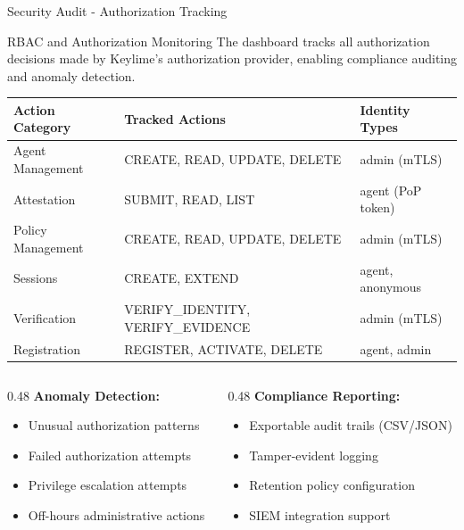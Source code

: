 \begin{frame}{Security Audit - Authorization Tracking}
  \begin{block}{RBAC and Authorization Monitoring}
    \scriptsize
    The dashboard tracks all authorization decisions made by Keylime's authorization provider,
    enabling compliance auditing and anomaly detection.
  \end{block}

  \vspace{0.1cm}

  \scriptsize
  \begin{center}
    \begin{tabular}{|l|l|l|}
      \hline
      \textbf{Action Category} & \textbf{Tracked Actions} & \textbf{Identity Types} \\
      \hline
      \hline
      Agent Management & CREATE, READ, UPDATE, DELETE & admin (mTLS) \\
      \hline
      Attestation & SUBMIT, READ, LIST & agent (PoP token) \\
      \hline
      Policy Management & CREATE, READ, UPDATE, DELETE & admin (mTLS) \\
      \hline
      Sessions & CREATE, EXTEND & agent, anonymous \\
      \hline
      Verification & VERIFY\_IDENTITY, VERIFY\_EVIDENCE & admin (mTLS) \\
      \hline
      Registration & REGISTER, ACTIVATE, DELETE & agent, admin \\
      \hline
    \end{tabular}
  \end{center}

  \vspace{0.2cm}

  \begin{columns}[T]
    \begin{column}{0.48\textwidth}
      \textbf{Anomaly Detection:}
      \begin{itemize}
        \item Unusual authorization patterns
        \item Failed authorization attempts
        \item Privilege escalation attempts
        \item Off-hours administrative actions
      \end{itemize}
    \end{column}
    \begin{column}{0.48\textwidth}
      \textbf{Compliance Reporting:}
      \begin{itemize}
        \item Exportable audit trails (CSV/JSON)
        \item Tamper-evident logging
        \item Retention policy configuration
        \item SIEM integration support
      \end{itemize}
    \end{column}
  \end{columns}
\end{frame}


